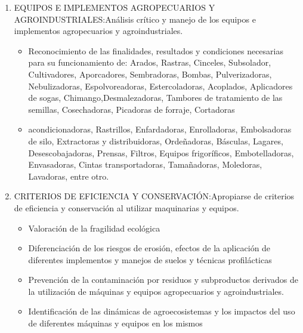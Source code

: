 \begin{enumerate}
\begin{itemize}
\begin{itemize}
    \end{itemize}
    \end{itemize}
    \item EQUIPOS E IMPLEMENTOS AGROPECUARIOS Y AGROINDUSTRIALES:Análisis crítico y manejo de los equipos e implementos agropecuarios y agroindustriales. 
    \begin{itemize}
        \item  Reconocimiento de las finalidades, resultados y
condiciones necesarias para su funcionamiento de:
Arados, Rastras, Cinceles, Subsolador, Cultivadores,
Aporcadores, Sembradoras, Bombas, Pulverizadoras,
Nebulizadoras, Espolvoreadoras, Estercoladoras,
Acoplados, Aplicadores de sogas, Chimango,Desmalezadoras, Tambores de tratamiento de las
semillas, Cosechadoras, Picadoras de forraje, Cortadoras
\item acondicionadoras, Rastrillos, Enfardadoras,
Enrolladoras, Embolsadoras de silo, Extractoras y
distribuidoras, Ordeñadoras, Básculas, Lagares,
Desescobajadoras, Prensas, Filtros, Equipos frigoríficos,
Embotelladoras, Envasadoras, Cintas transportadoras,
Tamañadoras, Moledoras, Lavadoras, entre otro. 
    \end{itemize}
    \item CRITERIOS DE EFICIENCIA Y CONSERVACIÓN:Apropiarse de criterios de eficiencia y conservación al utilizar maquinarias y equipos. 
 \begin{itemize}
     \item Valoración de la fragilidad ecológica
\item Diferenciación de los riesgos de erosión, efectos de la
aplicación de diferentes implementos y manejos de
suelos y técnicas profilácticas
\item Prevención de la contaminación por residuos y
subproductos derivados de la utilización de máquinas y
equipos agropecuarios y agroindustriales.
\item Identificación de las dinámicas de agroecosistemas y los
impactos del uso de diferentes máquinas y equipos en los
mismos
 \end{itemize}
\end{enumerate}

